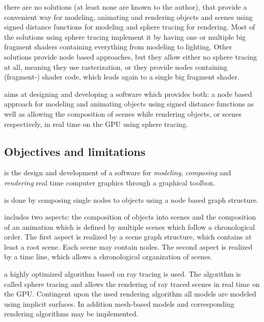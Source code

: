 \documentclass[%
    a4paper,    %
    justified,  %
    nobib,      %
    openany     %
]{tufte-book}
\begin{document}
 there are no solutions (at least none are
known to the author), that provide a convenient way for modeling, animating and
rendering objects and scenes using signed distance functions for modeling and
sphere tracing for rendering.
Most of the solutions using sphere tracing implement it by having one or
multiple big fragment shaders containing everything from modeling to lighting.
Other solutions provide node based approaches, but they allow either no sphere
tracing at all, meaning they use rasterization, or they provide nodes containing
(fragment-) shader code, which leads again to a single big fragment shader.

 aims at designing and developing a software which
provides both: a node based approach for modeling and animating objects using
signed distance functions as well as allowing the composition of scenes while
rendering objects, or scenes respectively, in real time on the GPU using sphere
tracing.

\subsection{Objectives and limitations}
\label{subsec:objectives}

 is the design and development of a
software for \textit{modeling}, \textit{composing} and \textit{rendering} real
time computer graphics through a graphical toolbox.

 is done by composing single nodes to objects using a
node based graph structure.

 includes two aspects: the composition of objects into
scenes and the composition of an animation which is defined by multiple scenes
which follow a chronological order. The first aspect is realized by a scene
graph structure, which contains at least a root scene. Each scene may contain
nodes. The second aspect is realized by a time line, which allows a
chronological organization of scenes.

 a highly optimized algorithm based on ray tracing is
used. The algorithm is called sphere tracing and allows the rendering of ray
traced scenes in real time on the GPU. Contingent upon the used rendering
algorithm all models are modeled using implicit surfaces. In addition
mesh-based models and corresponding rendering algorithms may be implemented.
\end{document}
